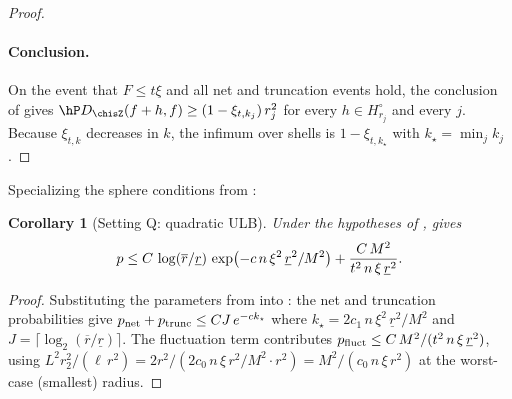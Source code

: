 \documentclass{article}
\newtheorem{corollary}[theorem]{Corollary}
\newcommand{\setupvariants}{%
  \stepcounter{theorem}%
  \xdef\variantbase{\arabic{theorem}}%
  \addtocounter{theorem}{-1}%
}
\newcommand{\theoremvariant}[1]{%
  \setcounter{theorem}{\numexpr\variantbase-1\relax}%
  \renewcommand{\thetheorem}{\thesection.\variantbase\textup{#1}}%
}
\newcommand{\resettheorem}{%
  \renewcommand{\thetheorem}{\thesection.\arabic{theorem}}%
}
\begin{document}
\begin{proof}
\paragraph{Conclusion.}
On the event that $F \le t\xi$
and all net and truncation events hold,
the conclusion of 
gives $\hP D_{\chisZ}(f+h,f) \ge (1 - \xi_{t,k_j})\, r_j^2$
for every $h \in H_{r_j}^\circ$ and every $j$.
Because $\xi_{t,k}$ decreases in $k$,
the infimum over shells is
$1 - \xi_{t,k_\star}$
with $k_\star = \min_j k_j$.
\end{proof}

Specializing the sphere conditions from
:

\setupvariants

\theoremvariant{Q}
\begin{corollary}[Setting Q: quadratic ULB]
\label{cor:ulb-quadratic-ball}
Under the hypotheses of ,
 gives
\[
p \le C\, \log(\overline{r}/\underline{r})\,
  \exp\!\qty(-c\, n\, \xi^2\, \underline{r}^2/M^2)
  + \frac{C\, M^2}{t^2\, n\, \xi\, \underline{r}^2}.
\]
\end{corollary}
\begin{proof}
Substituting the parameters from 
into :
the net and truncation probabilities give
$p_{\textup{net}} + p_{\textup{trunc}}
  \le C J\, e^{-c k_\star}$
where $k_\star = 2c_1\, n\, \xi^2\, \underline{r}^2/M^2$
and $J = \lceil\log_2(\overline{r}/\underline{r})\rceil$.
The fluctuation term contributes
$p_{\textup{fluct}}
  \le C\, M^2 / (t^2\, n\, \xi\, \underline{r}^2)$,
using $L^2 r_2^2 / (\ell\, r^2)
  = 2r^2 / (2c_0\, n\, \xi\, r^2/M^2 \cdot r^2)
  = M^2 / (c_0\, n\, \xi\, r^2)$
at the worst-case (smallest) radius.
\end{proof}
\resettheorem
\end{document}
